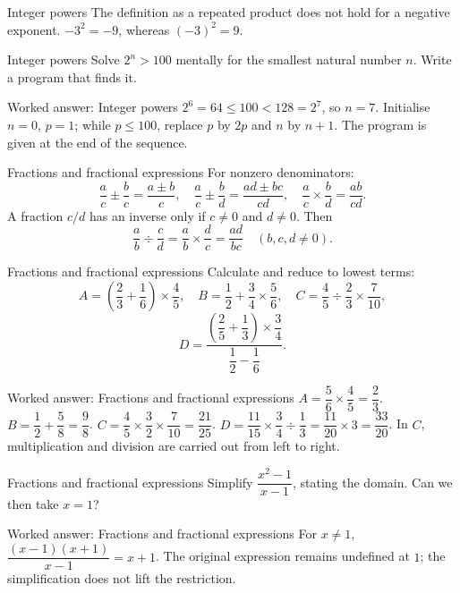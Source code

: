 \documentclass[aspectratio=169,10pt]{beamer}
\begin{document}
\begin{frame}{Integer powers}
The definition as a repeated product does not hold for a negative exponent. \(-3^2=-9\), whereas \((-3)^2=9\).
\end{frame}
\begin{frame}{Integer powers}
Solve \(2^n>100\) mentally for the smallest natural number \(n\). Write a program that finds it.
\end{frame}
\begin{frame}{Worked answer: Integer powers}
\(2^6=64\leq100<128=2^7\), so \(n=7\). Initialise \(n=0\), \(p=1\); while \(p\leq100\), replace \(p\) by \(2p\) and \(n\) by \(n+1\). The program is given at the end of the sequence.
\end{frame}
\begin{frame}{Fractions and fractional expressions}
For nonzero denominators:
\[\dfrac ac\pm\dfrac bc=\dfrac{a\pm b}{c},\quad\dfrac ac\pm\dfrac bd=\dfrac{ad\pm bc}{cd},\quad\dfrac ac\times\dfrac bd=\dfrac{ab}{cd}.\]
A fraction \(c/d\) has an inverse only if \(c\ne0\) and \(d\ne0\). Then
\[\dfrac ab\div\dfrac cd=\dfrac ab\times\dfrac dc=\dfrac{ad}{bc}\quad(b,c,d\ne0).\]
\end{frame}
\begin{frame}{Fractions and fractional expressions}
Calculate and reduce to lowest terms:
\[A=\left(\dfrac23+\dfrac16\right)\times\dfrac45,\quad B=\dfrac12+\dfrac34\times\dfrac56,\quad C=\dfrac45\div\dfrac23\times\dfrac7{10},\]
\[D=\dfrac{\left(\dfrac25+\dfrac13\right)\times\dfrac34}{\dfrac12-\dfrac16}.\]
\end{frame}
\begin{frame}{Worked answer: Fractions and fractional expressions}
\(A=\dfrac56\times\dfrac45=\dfrac23\). \(B=\dfrac12+\dfrac58=\dfrac98\). \(C=\dfrac45\times\dfrac32\times\dfrac7{10}=\dfrac{21}{25}\). \(D=\dfrac{11}{15}\times\dfrac34\div\dfrac13=\dfrac{11}{20}\times3=\dfrac{33}{20}\). In \(C\), multiplication and division are carried out from left to right.
\end{frame}
\begin{frame}{Fractions and fractional expressions}
Simplify \(\dfrac{x^2-1}{x-1}\), stating the domain. Can we then take \(x=1\)?
\end{frame}
\begin{frame}{Worked answer: Fractions and fractional expressions}
For \(x\ne1\), \(\dfrac{(x-1)(x+1)}{x-1}=x+1\). The original expression remains undefined at \(1\); the simplification does not lift the restriction.
\end{frame}
\end{document}
